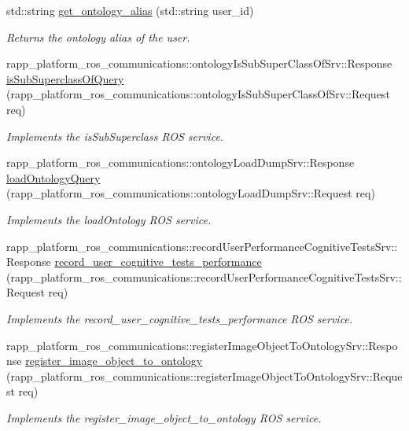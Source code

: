 \begin{DoxyCompactItemize}
std\-::string \hyperlink{classKnowrobWrapper_af50b1b512559d86a74c6de69a34ac3cc}{get\-\_\-ontology\-\_\-alias} (std\-::string user\-\_\-id)
\begin{DoxyCompactList}\small\item\em Returns the ontology alias of the user. \end{DoxyCompactList}\item 
rapp\-\_\-platform\-\_\-ros\-\_\-communications\-::ontology\-Is\-Sub\-Super\-Class\-Of\-Srv\-::\-Response \hyperlink{classKnowrobWrapper_a0608e1b44bdbf4925b8f3df7433e1b4d}{is\-Sub\-Superclass\-Of\-Query} (rapp\-\_\-platform\-\_\-ros\-\_\-communications\-::ontology\-Is\-Sub\-Super\-Class\-Of\-Srv\-::\-Request req)
\begin{DoxyCompactList}\small\item\em Implements the is\-Sub\-Superclass R\-O\-S service. \end{DoxyCompactList}\item 
rapp\-\_\-platform\-\_\-ros\-\_\-communications\-::ontology\-Load\-Dump\-Srv\-::\-Response \hyperlink{classKnowrobWrapper_acb503520ab8db0e11b5d6511c7d1a69b}{load\-Ontology\-Query} (rapp\-\_\-platform\-\_\-ros\-\_\-communications\-::ontology\-Load\-Dump\-Srv\-::\-Request req)
\begin{DoxyCompactList}\small\item\em Implements the load\-Ontology R\-O\-S service. \end{DoxyCompactList}\item 
rapp\-\_\-platform\-\_\-ros\-\_\-communications\-::record\-User\-Performance\-Cognitive\-Tests\-Srv\-::\-Response \hyperlink{classKnowrobWrapper_a77d7c7d52db582093065271ebb6d8be7}{record\-\_\-user\-\_\-cognitive\-\_\-tests\-\_\-performance} (rapp\-\_\-platform\-\_\-ros\-\_\-communications\-::record\-User\-Performance\-Cognitive\-Tests\-Srv\-::\-Request req)
\begin{DoxyCompactList}\small\item\em Implements the record\-\_\-user\-\_\-cognitive\-\_\-tests\-\_\-performance R\-O\-S service. \end{DoxyCompactList}\item 
rapp\-\_\-platform\-\_\-ros\-\_\-communications\-::register\-Image\-Object\-To\-Ontology\-Srv\-::\-Response \hyperlink{classKnowrobWrapper_a7a53523ea96e21a32f7f52495ce81f3a}{register\-\_\-image\-\_\-object\-\_\-to\-\_\-ontology} (rapp\-\_\-platform\-\_\-ros\-\_\-communications\-::register\-Image\-Object\-To\-Ontology\-Srv\-::\-Request req)
\begin{DoxyCompactList}\small\item\em Implements the register\-\_\-image\-\_\-object\-\_\-to\-\_\-ontology R\-O\-S service. \end{DoxyCompactList}\item 

\end{DoxyCompactItemize}
